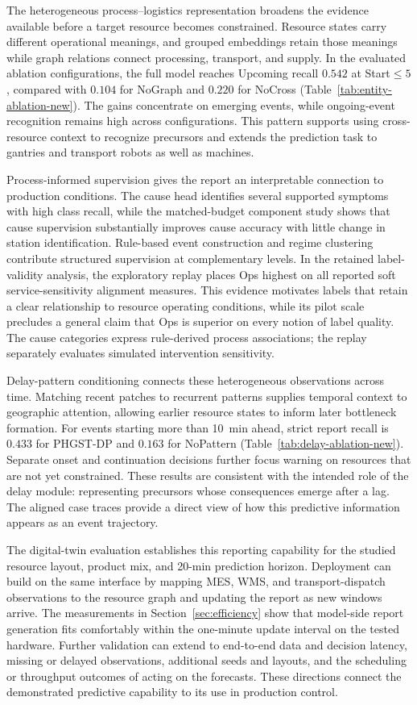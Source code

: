 \documentclass[a4paper,fleqn]{cas-dc}
\begin{document}
The heterogeneous process--logistics representation broadens the evidence available before a target resource becomes constrained. Resource states carry different operational meanings, and grouped embeddings retain those meanings while graph relations connect processing, transport, and supply. In the evaluated ablation configurations, the full model reaches Upcoming recall $0.542$ at Start$\leq5$, compared with $0.104$ for NoGraph and $0.220$ for NoCross (Table~\ref{tab:entity-ablation-new}). The gains concentrate on emerging events, while ongoing-event recognition remains high across configurations. This pattern supports using cross-resource context to recognize precursors and extends the prediction task to gantries and transport robots as well as machines.


Process-informed supervision gives the report an interpretable connection to production conditions. The cause head identifies several supported symptoms with high class recall, while the matched-budget component study shows that cause supervision substantially improves cause accuracy with little change in station identification. Rule-based event construction and regime clustering contribute structured supervision at complementary levels. In the retained label-validity analysis, the exploratory replay places Ops highest on all reported soft service-sensitivity alignment measures. This evidence motivates labels that retain a clear relationship to resource operating conditions, while its pilot scale precludes a general claim that Ops is superior on every notion of label quality. The cause categories express rule-derived process associations; the replay separately evaluates simulated intervention sensitivity.


Delay-pattern conditioning connects these heterogeneous observations across time. Matching recent patches to recurrent patterns supplies temporal context to geographic attention, allowing earlier resource states to inform later bottleneck formation. For events starting more than 10~min ahead, strict report recall is $0.433$ for PHGST-DP and $0.163$ for NoPattern (Table~\ref{tab:delay-ablation-new}). Separate onset and continuation decisions further focus warning on resources that are not yet constrained. These results are consistent with the intended role of the delay module: representing precursors whose consequences emerge after a lag. The aligned case traces provide a direct view of how this predictive information appears as an event trajectory.


The digital-twin evaluation establishes this reporting capability for the studied resource layout, product mix, and 20-min prediction horizon. Deployment can build on the same interface by mapping MES, WMS, and transport-dispatch observations to the resource graph and updating the report as new windows arrive. The measurements in Section~\ref{sec:efficiency} show that model-side report generation fits comfortably within the one-minute update interval on the tested hardware. Further validation can extend to end-to-end data and decision latency, missing or delayed observations, additional seeds and layouts, and the scheduling or throughput outcomes of acting on the forecasts. These directions connect the demonstrated predictive capability to its use in production control.
\end{document}
